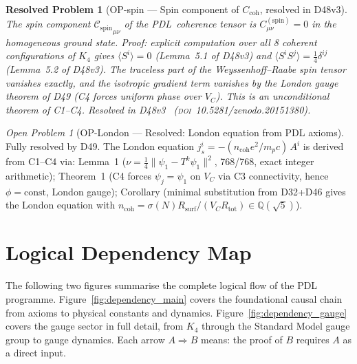 \documentclass[11pt,a4paper]{article}
\newtheorem{resolvedproblem}{Resolved Problem}
\newcommand{\Cspin}{{\mathcal{C}_{\mathrm{spin}}}}
\theoremstyle{plain}
\theoremstyle{definition}
\theoremstyle{remark}
\newtheorem{openproblem}[theorem]{Open Problem}
\newcommand{\PDL}{\textnormal{PDL}}
\newcommand{\Rsurf}{R_{\mathrm{surf}}}
\newcommand{\Rtot}{R_{\mathrm{tot}}}
\newcommand{\Ccoh}{C_{\mathrm{coh}}}
\begin{document}
\begin{resolvedproblem}[OP-spin --- Spin component of $\Ccoh$, resolved in D48v3]
\label{op:spin}
The spin component $\Cspin_{\mu\nu}$ of the \PDL\ coherence tensor is $C^{(\mathrm{spin})}_{\mu\nu} = 0$ in the homogeneous ground state. Proof: explicit computation over all 8 coherent configurations of $K_4$ gives $\langle S^i\rangle = 0$ (Lemma~5.1 of D48v3) and $\langle S^i S^j\rangle = \tfrac{1}{4}\delta^{ij}$ (Lemma~5.2 of D48v3). The traceless part of the Weyssenhoff--Raabe spin tensor vanishes exactly, and the isotropic gradient term vanishes by the London gauge theorem of D49 (C4 forces uniform phase over $V_C$). This is an unconditional theorem of C1--C4. Resolved in D48v3~\cite{D48} (\textsc{doi}~10.5281/zenodo.20151380).
\end{resolvedproblem}

\begin{openproblem}[OP-London --- Resolved: London equation from PDL axioms]
\label{op:London}
\textcolor{proofblue}{Fully resolved by D49.} The London equation $j^i_s = -(n_{\mathrm{coh}} e^2/m_p c)\,A^i$ is derived from C1--C4 via: Lemma~1 ($\nu = \tfrac{1}{4}\|\psi_1 - T^k\psi_1\|^2$, 768/768, exact integer arithmetic); Theorem~1 (C4 forces $\psi_j = \psi_1$ on $V_C$ via C3 connectivity, hence $\phi = \mathrm{const}$, London gauge); Corollary (minimal substitution from D32+D46 gives the London equation with $n_{\mathrm{coh}} = \sigma(N)\Rsurf/(V_C\Rtot) \in \mathbb{Q}(\sqrt{5})$).
\end{openproblem}

\clearpage

\section{Logical Dependency Map}
\label{sec:dependency}

The following two figures summarise the complete logical flow of the PDL programme. Figure~\ref{fig:dependency_main} covers the foundational causal chain from axioms to physical constants and dynamics. Figure~\ref{fig:dependency_gauge} covers the gauge sector in full detail, from $K_4$ through the Standard Model gauge group to gauge dynamics. Each arrow $A\Rightarrow B$ means: the proof of $B$ requires $A$ as a direct input.
\end{document}
